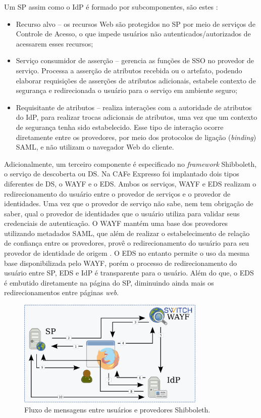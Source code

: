 Um SP assim como o IdP é formado por subcomponentes, são estes \cite{scavo:05}:

\begin{itemize}
 \item Recurso alvo --  os recursos Web são protegidos no SP por meio de serviços de Controle de Acesso, o que impede usuários não autenticados/autorizados de acessarem esses recursos;
 \item Serviço consumidor de asserção -- gerencia as funções de SSO no provedor de serviço. Processa a asserção de atributos recebida ou o artefato, podendo elaborar requisições de asserções de atributos adicionais, estabele contexto de segurança e redirecionada o usuário para o serviço em ambiente seguro;
 \item Requisitante de atributos -- realiza interações com a autoridade de atributos do IdP, para realizar trocas adicionais de atributos, uma vez que um contexto de segurança tenha sido estabelecido. Esse tipo de interação ocorre diretamente entre os provedores, por meio dos protocolos de ligação (\textit{binding}) SAML, e não utilizam o navegador Web do cliente.
\end{itemize}

Adicionalmente, um terceiro componente é especificado no \textit{framework} Shibboleth, o serviço de descoberta ou \acf{DS}. Na CAFe Expresso foi implantado dois tipos diferentes de DS, o \acf{WAYF} e o \acf{EDS}. Ambos os serviços, WAYF e EDS realizam o redirecionamento do usuário entre o provedor de serviços e o provedor de identidades. Uma vez que o provedor de serviço não sabe, nem tem obrigação de saber, qual o provedor de identidades que o usuário utiliza para validar seus credenciais de autenticação. O WAYF mantém uma base dos provedores utilizando metadados SAML, que além de realizar o estabelecimento de relação de confiança entre os provedores, provê o redirecionamento do usuário para seu provedor de identidade de origem \cite{shibb:05, kallela:08, wangham:10b}. O EDS no entanto permite o uso da mesma base disponibilizada pelo WAYF, porém o processo de redirecionamento do usuário entre SP, EDS e IdP é transparente para o usuário. Além do que, o EDS é embutido diretamente na página do SP, diminuindo 
ainda mais os redirecionamentos entre páginas \textit{web}.

\begin{figure}[!htpb]
 \centering
 \includegraphics[width=0.8\textwidth]{figuras/fluxo-shibboleth.png}
 \caption{Fluxo de mensagens entre usuários e provedores Shibboleth.}
 \label{fig_5}
\end{figure}

